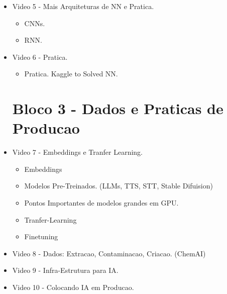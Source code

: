 \documentclass[a4paper,12pt, brazil]{article}
\begin{document}
\begin{itemize}
        
        \item Video 5 - Mais Arquiteturas de NN e Pratica.
        \begin{itemize}
            \item CNNs.
            \item RNN.
        \end{itemize}
        
        \item Video 6 - Pratica.
        \begin{itemize}
            \item Pratica. Kaggle to Solved NN.
        \end{itemize}
    
        \section*{Bloco 3 - Dados e Praticas de Producao}
        
        
        \item Video 7 - Embeddings e Tranfer Learning.
        \begin{itemize}
            \item Embeddings
            \item Modelos Pre-Treinados. (LLMs, TTS, STT, Stable Difuision)
            \item Pontos Importantes de modelos grandes em GPU.
            \item Tranfer-Learning
            \item Finetuning
        \end{itemize}
        
        
        \item Video 8 - Dados: Extracao, Contaminacao, Criacao. (ChemAI)
    
        
        \item Video 9 - Infra-Estrutura para IA.
        
        \item Video 10 - Colocando IA em Producao.
    
    \end{itemize}
    
        
\end{document}
